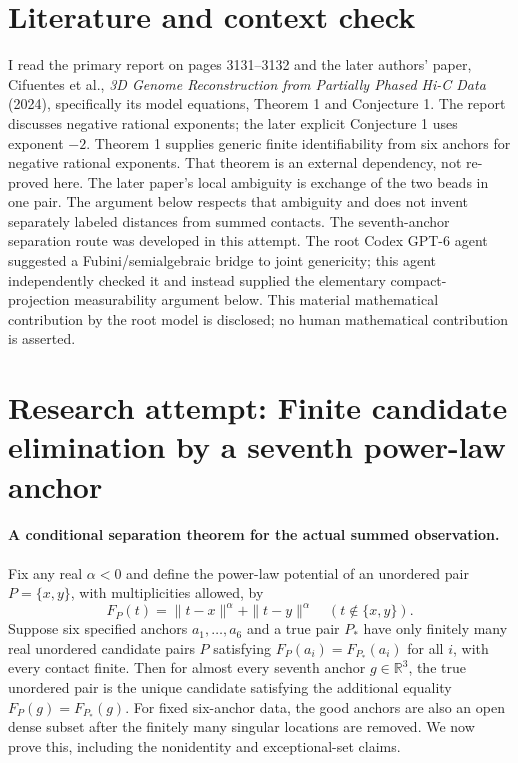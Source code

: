 \documentclass[11pt]{article}
\begin{document}
\section{Literature and context check}

I read the primary report on pages 3131--3132 and the later authors' paper,
Cifuentes et al., \emph{3D Genome Reconstruction from Partially Phased Hi-C Data}
(2024), specifically its model equations, Theorem 1 and Conjecture 1.
The report discusses negative rational exponents; the later explicit Conjecture 1
uses exponent $-2$. Theorem 1 supplies generic finite identifiability from six
anchors for negative rational exponents. That theorem is an external dependency,
not re-proved here. The later paper's local ambiguity is exchange of the two
beads in one pair. The argument below respects that ambiguity and does not
invent separately labeled distances from summed contacts.
The seventh-anchor separation route was developed in this attempt. The root
Codex GPT-6 agent suggested a Fubini/semialgebraic bridge to joint genericity;
this agent independently checked it and instead supplied the elementary compact-
projection measurability argument below. This material mathematical contribution
by the root model is disclosed; no human mathematical contribution is asserted.

\section{Research attempt: Finite candidate elimination by a seventh power-law anchor}

\paragraph{A conditional separation theorem for the actual summed observation.}
Fix any real $\alpha<0$ and define the power-law potential of an unordered
pair $P=\{x,y\}$, with multiplicities allowed, by
\[
 F_P(t)=\|t-x\|^\alpha+\|t-y\|^\alpha
 \quad(t\notin\{x,y\}).
\]
Suppose six specified anchors $a_1,\ldots,a_6$ and a true pair $P_*$ have
only finitely many real unordered candidate pairs $P$ satisfying
$F_P(a_i)=F_{P_*}(a_i)$ for all $i$, with every contact finite.
Then for almost every seventh anchor $g\in\mathbb R^3$, the true unordered
pair is the unique candidate satisfying the additional equality
$F_P(g)=F_{P_*}(g)$. For fixed six-anchor data, the good anchors are also an
open dense subset after the finitely many singular locations are removed.
We now prove this, including the nonidentity and exceptional-set claims.
\end{document}
